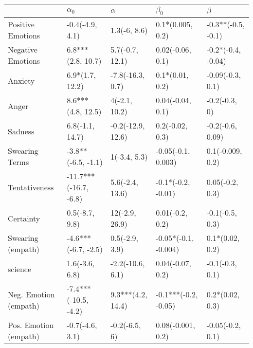\begin{tabular}{lllll}
\toprule
{} &             $\alpha_0$ &           $\alpha$ &             $\beta_0$ &             $\beta$ \\
\midrule
Positive Emotions     &        -0.4(-4.9, 4.1) &       1.3(-6, 8.6) &      0.1*(0.005, 0.2) &  -0.3**(-0.5, -0.1) \\
Negative Emotions     &      6.8***(2.8, 10.7) &    5.7(-0.7, 12.1) &      0.02(-0.06, 0.1) &  -0.2*(-0.4, -0.04) \\
Anxiety               &        6.9*(1.7, 12.2) &   -7.8(-16.3, 0.7) &       0.1*(0.01, 0.2) &    -0.09(-0.3, 0.1) \\
Anger                 &      8.6***(4.8, 12.5) &      4(-2.1, 10.2) &      0.04(-0.04, 0.1) &       -0.2(-0.3, 0) \\
Sadness               &        6.8(-1.1, 14.7) &  -0.2(-12.9, 12.6) &       0.2(-0.02, 0.3) &    -0.2(-0.6, 0.09) \\
Swearing Terms        &     -3.8**(-6.5, -1.1) &       1(-3.4, 5.3) &    -0.05(-0.1, 0.003) &    0.1(-0.009, 0.2) \\
Tentativeness         &  -11.7***(-16.7, -6.8) &    5.6(-2.4, 13.6) &    -0.1*(-0.2, -0.01) &     0.05(-0.2, 0.3) \\
Certainty             &         0.5(-8.7, 9.8) &     12(-2.9, 26.9) &       0.01(-0.2, 0.2) &     -0.1(-0.5, 0.3) \\
Swearing (empath)     &    -4.6***(-6.7, -2.5) &     0.5(-2.9, 3.9) &  -0.05*(-0.1, -0.004) &     0.1*(0.02, 0.2) \\
science               &         1.6(-3.6, 6.8) &   -2.2(-10.6, 6.1) &      0.04(-0.07, 0.2) &     -0.1(-0.3, 0.1) \\
Neg. Emotion (empath) &   -7.4***(-10.5, -4.2) &  9.3***(4.2, 14.4) &  -0.1***(-0.2, -0.05) &     0.2*(0.02, 0.3) \\
Pos. Emotion (empath) &        -0.7(-4.6, 3.1) &      -0.2(-6.5, 6) &     0.08(-0.001, 0.2) &    -0.05(-0.2, 0.1) \\
\bottomrule
\end{tabular}
